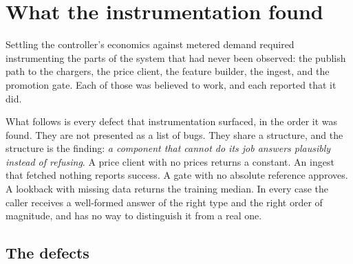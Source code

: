 %
%

\section{What the instrumentation found}
\label{sec:defects}

Settling the controller's economics against metered demand required
instrumenting the parts of the system that had never been observed: the
publish path to the chargers, the price client, the feature builder, the
ingest, and the promotion gate. Each of those was believed to work, and each
reported that it did.

What follows is every defect that instrumentation surfaced, in the order it
was found. They are not presented as a list of bugs. They share a structure,
and the structure is the finding: \emph{a component that cannot do its job
answers plausibly instead of refusing}. A price client with no prices returns
a constant. An ingest that fetched nothing reports success. A gate with no
absolute reference approves. A lookback with missing data returns the training
median. In every case the caller receives a well-formed answer of the right
type and the right order of magnitude, and has no way to distinguish it from a
real one.

\subsection{The defects}

